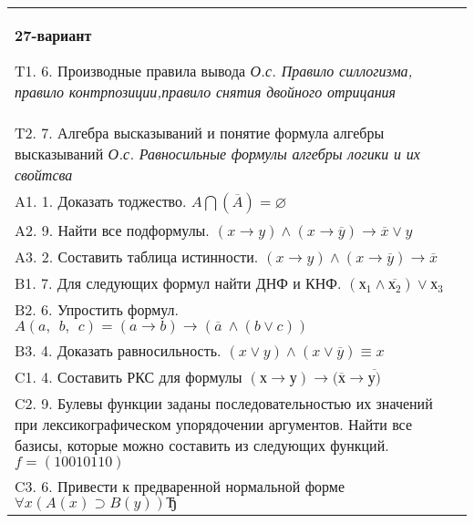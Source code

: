 \documentclass{article}
\begin{document}
\begin{tabular}{m{17cm}}
\textbf{27-вариант}
\newline

T1. 6. Производные правила вывода \emph{О.с. Правило силлогизма, правило контрпозиции,правило снятия двойного отрицания} \\
T2. 7. Алгебра высказываний и понятие формула алгебры высказываний \emph{О.с. Равносильные формулы алгебры логики и их свойтсва} \\
A1. 1. Доказать тоджество. \(A\bigcap(\overline{A}) = \varnothing\) \\
A2. 9. Найти все подформулы. \((x \rightarrow y) \land (x \rightarrow \overline{y}) \rightarrow \overline{x} \vee y\) \\
A3. 2. Составить таблица истинности. \((x \rightarrow y) \land (x \rightarrow \overline{y}) \rightarrow \overline{x}\) \\
B1. 7. Для следующих формул найти ДНФ и КНФ. \(\left( х_{1} \land \overline{х_{2}} \right) \vee х_{3}\) \\
B2. 6. Упростить формул. \(A(a,\ \ b,\ \ c) = (a \rightarrow b) \rightarrow (\overline{a}\  \land (b \vee c))\) \\
B3. 4. Доказать равносильность. \((x \vee y) \land (x \vee \overline{y}) \equiv x\) \\
C1. 4. Составить РКС для формулы \((х \rightarrow у) \rightarrow (\overline{х} \rightarrow \overline{у)}\) \\
C2. 9. Булевы функции заданы последовательностью их значений при лексикографическом упорядочении аргументов. Найти все базисы, которые можно составить из следующих функций. \(f = (10010110)\) \\
C3. 6. Привести к предваренной нормальной форме \(\forall x(A(x) \supset B(y))Ђ\) \\

\end{tabular}
\vspace{1cm}
\end{document}
